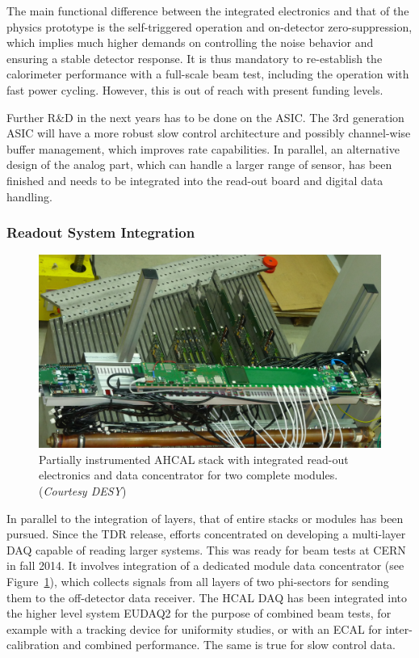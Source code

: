 The main functional difference between the integrated electronics and that of the physics prototype is the self-triggered operation and on-detector zero-suppression, which implies much higher demands on controlling the noise behavior and ensuring a stable detector response. It is thus mandatory to re-establish the calorimeter performance with a full-scale beam test, including the operation with fast power cycling. However, this is out of reach with present funding levels.

Further R\&D in the next years has to be done on the ASIC. The 3rd generation ASIC will have a more robust slow control architecture and possibly channel-wise buffer management, which improves rate capabilities. In parallel, an alternative design of the analog part, which can handle a larger range of sensor, has been finished and needs to be integrated into the read-out board and digital data handling.

\subsubsection{Readout System Integration}

\begin{figure}
	\centering
	\includegraphics[width=.5\textwidth]{Calorimeter/AHCAL/AHCAL_Stack}
	\caption{Partially instrumented AHCAL stack with integrated read-out electronics and data concentrator for two complete modules.({\it Courtesy DESY})}
	\label{fig:Calorimeter:AHCAL:Stack}
\end{figure}

In parallel to the integration of layers, that of entire stacks or modules has been pursued. Since the TDR release, efforts concentrated on developing a multi-layer DAQ capable of reading larger systems. This was ready for beam tests at CERN in fall 2014. It involves integration of a dedicated module data concentrator (see Figure~\ref{fig:Calorimeter:AHCAL:Stack}), which collects signals from all layers of two phi-sectors for sending them to the off-detector data receiver. The HCAL DAQ has been integrated into the higher level system EUDAQ2 for the purpose of combined beam tests, for example with a tracking device for uniformity studies, or with an ECAL for inter-calibration and combined performance. The same is true for slow control data.


